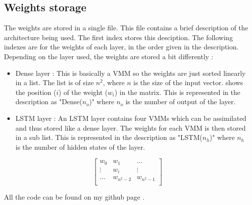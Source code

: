 \subsection{Weights storage}\label{subsec:weiStore}

The weights are stored in a single file. This file contains a brief description of the architecture being used. The first index stores this desciption. The following indexes are for the weights of each layer, in the order given in the description. Depending on the layer used, the weights are stored a bit differently :

\begin{itemize}
  \item Dense layer : This is basically a \ac{VMM} so the weights are just sorted linearly in a list. The list is of size $n^2$, where $n$ is the size of the input vector.  shows the position ($i$) of the weight ($w_i$) in the matrix. This is represented in the description as "Dense($n_o$)" where $n_o$ is the number of output of the layer.
  \item \ac{LSTM} layer : An \ac{LSTM} layer contains four \acp{VMM} which can be assimilated and thus stored like a dense layer. The weights for each \ac{VMM} is then stored in a sub list. This is represented in the description as "LSTM($n_h$)" where $n_h$ is the number of hidden states of the layer.
\end{itemize}

\begin{equation}\label{mtrx:wei}
  \begin{bmatrix}
    w_{0} & w_{1} & \dots \\
    \vdots & w_i & \vdots \\
    \dots & w_{n^2-2} & w_{n^2-1}\\
  \end{bmatrix}
\end{equation}

All the code can be found on my github page \cite{lstmGen}.
